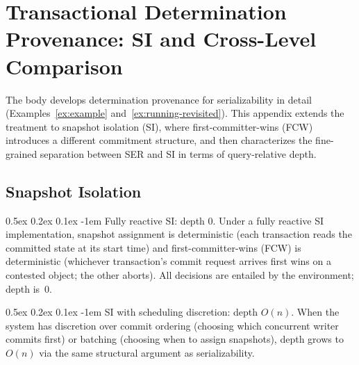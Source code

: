 \documentclass[acmsmall,review,anonymous]{acmart}
\makeatletter
\renewcommand{\paragraph}{\@startsection{paragraph}{4}{\z@}%
  {0.5ex \@plus 0.2ex \@minus 0.1ex}%
  {-1em}%
  {\normalfont\normalsize\bfseries}}
\theoremstyle{remark}
\numberwithin{definition}{section}
\numberwithin{theorem}{section}
\numberwithin{lemma}{section}
\numberwithin{corollary}{section}
\numberwithin{remark}{section}
\numberwithin{example}{section}
\numberwithin{observation}{section}
\numberwithin{assumption}{section}
\makeatother
\begin{document}
\section{Transactional Determination Provenance: SI and Cross-Level Comparison}
\label{sec:appendix-concurrency}

The body develops determination provenance for serializability in
detail (Examples~\ref{ex:example} and~\ref{ex:running-revisited}).
This appendix extends the treatment to snapshot isolation (SI), where
first-committer-wins (FCW) introduces a different commitment
structure, and then characterizes the fine-grained separation between
SER and SI in terms of query-relative depth.

\subsection{Snapshot Isolation}
\label{sec:appendix-SI}

\paragraph{Fully reactive SI: depth $0$.}
Under a fully reactive SI implementation, snapshot assignment is
deterministic (each transaction reads the committed state at its start
time) and first-committer-wins (FCW) is deterministic (whichever
transaction's commit request arrives first wins on a contested object;
the other aborts).
All decisions are entailed by the environment; depth is~$0$.

\paragraph{SI with scheduling discretion: depth $O(n)$.}
When the system has discretion over commit ordering (choosing which
concurrent writer commits first) or batching (choosing when to assign
snapshots), depth grows to $O(n)$ via the same structural argument as
serializability.
\end{document}
